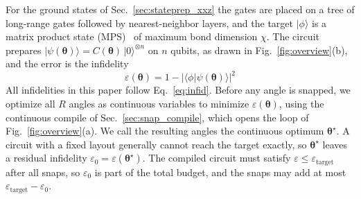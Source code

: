 For the ground states of Sec.~\ref{sec:stateprep_xxz} the gates are placed on a tree of long-range gates followed by nearest-neighbor layers, and the target $|\phi\rangle$ is a matrix product state (MPS)~\cite{Schollwock2011} of maximum bond dimension $\chi$. The circuit prepares $|\psi(\boldsymbol{\theta})\rangle = C(\boldsymbol{\theta})\,|0\rangle^{\otimes n}$ on $n$ qubits, as drawn in Fig.~\ref{fig:overview}(b), and the error is the infidelity
\begin{equation}
\varepsilon(\boldsymbol{\theta}) = 1 - \big| \langle \phi | \psi(\boldsymbol{\theta}) \rangle \big|^{2}
\label{eq:infid}
\end{equation}
All infidelities in this paper follow Eq.~\eqref{eq:infid}. Before any angle is snapped, we optimize all $R$ angles as continuous variables to minimize $\varepsilon(\boldsymbol{\theta})$, using the continuous compile of Sec.~\ref{sec:snap_compile}, which opens the loop of Fig.~\ref{fig:overview}(a). We call the resulting angles the continuous optimum $\boldsymbol{\theta}^{\star}$. A circuit with a fixed layout generally cannot reach the target exactly, so $\boldsymbol{\theta}^{\star}$ leaves a residual infidelity $\varepsilon_0 = \varepsilon(\boldsymbol{\theta}^{\star})$. The compiled circuit must satisfy $\varepsilon \leq \varepsilon_{\mathrm{target}}$ after all snaps, so $\varepsilon_0$ is part of the total budget, and the snaps may add at most $\varepsilon_{\mathrm{target}} - \varepsilon_0$.


